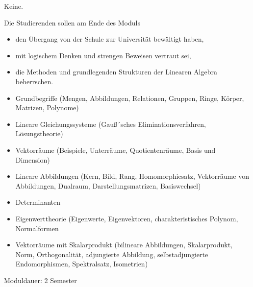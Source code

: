 \begin{module}
\begin{styleenv}
\begin{assessment}
\end{assessment}

\begin{conditions}Keine.\end{conditions}


\end{styleenv}

\begin{learningoutcomes}
Die Studierenden sollen am Ende des Moduls

 \begin{itemize}\item den Übergang von der Schule zur Universität bewältigt haben,  \item mit logischem Denken und strengen Beweisen vertraut sei,   \item die Methoden und grundlegenden Strukturen der Linearen Algebra beherrschen.  \end{itemize}
\end{learningoutcomes}

\begin{content}
\begin{itemize}\item Grundbegriffe (Mengen, Abbildungen, Relationen, Gruppen, Ringe, Körper, Matrizen, Polynome)   \item Lineare Gleichungssysteme (Gauß´sches Eliminationsverfahren, Lösungstheorie)   \item Vektorräume (Beispiele, Unterräume, Quotientenräume, Basis und Dimension)   \item Lineare Abbildungen (Kern, Bild, Rang, Homomorphiesatz, Vektorräume von Abbildungen, Dualraum, Darstellungsmatrizen, Basiswechsel)   \item Determinanten   \item Eigenwerttheorie (Eigenwerte, Eigenvektoren, charakteristisches Polynom, Normalformen  \item Vektorräume mit Skalarprodukt (bilineare Abbildungen, Skalarprodukt, Norm, Orthogonalität, adjungierte Abbildung, selbstadjungierte Endomorphismen, Spektralsatz, Isometrien)  \end{itemize}
\end{content}

\begin{remarks}Moduldauer: 2 Semester

\end{remarks}

\end{module}

